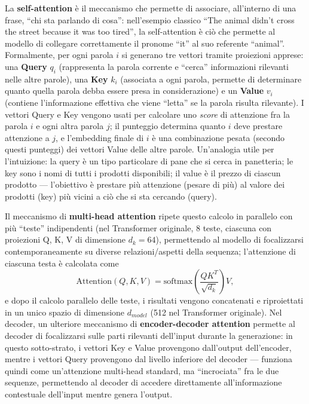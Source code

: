 \documentclass[11pt,a4paper]{report}
\begin{document}
La \textbf{self-attention} è il meccanismo che permette di associare, all'interno di una frase, ``chi sta parlando di cosa'': nell'esempio classico ``The animal didn't cross the street because it was too tired'', la self-attention è ciò che permette al modello di collegare correttamente il pronome ``it'' al suo referente ``animal''. Formalmente, per ogni parola $i$ si generano tre vettori tramite proiezioni apprese: una \textbf{Query} $q_i$ (rappresenta la parola corrente e ``cerca'' informazioni rilevanti nelle altre parole), una \textbf{Key} $k_i$ (associata a ogni parola, permette di determinare quanto quella parola debba essere presa in considerazione) e un \textbf{Value} $v_i$ (contiene l'informazione effettiva che viene ``letta'' se la parola risulta rilevante). I vettori Query e Key vengono usati per calcolare uno \emph{score} di attenzione fra la parola $i$ e ogni altra parola $j$; il punteggio determina quanto $i$ deve prestare attenzione a $j$, e l'embedding finale di $i$ è una combinazione pesata (secondo questi punteggi) dei vettori Value delle altre parole. Un'analogia utile per l'intuizione: la query è un tipo particolare di pane che si cerca in panetteria; le key sono i nomi di tutti i prodotti disponibili; il value è il prezzo di ciascun prodotto --- l'obiettivo è prestare più attenzione (pesare di più) al valore dei prodotti (key) più vicini a ciò che si sta cercando (query).

Il meccanismo di \textbf{multi-head attention} ripete questo calcolo in parallelo con più ``teste'' indipendenti (nel Transformer originale, 8 teste, ciascuna con proiezioni Q, K, V di dimensione $d_k=64$), permettendo al modello di focalizzarsi contemporaneamente su diverse relazioni/aspetti della sequenza; l'attenzione di ciascuna testa è calcolata come
\[
\mathrm{Attention}(Q,K,V) = \mathrm{softmax}\!\left(\frac{QK^T}{\sqrt{d_k}}\right)V,
\]
e dopo il calcolo parallelo delle teste, i risultati vengono concatenati e riproiettati in un unico spazio di dimensione $d_{model}$ (512 nel Transformer originale). Nel decoder, un ulteriore meccanismo di \textbf{encoder-decoder attention} permette al decoder di focalizzarsi sulle parti rilevanti dell'input durante la generazione: in questo sotto-strato, i vettori Key e Value provengono dall'output dell'encoder, mentre i vettori Query provengono dal livello inferiore del decoder --- funziona quindi come un'attenzione multi-head standard, ma ``incrociata'' fra le due sequenze, permettendo al decoder di accedere direttamente all'informazione contestuale dell'input mentre genera l'output.
\end{document}

